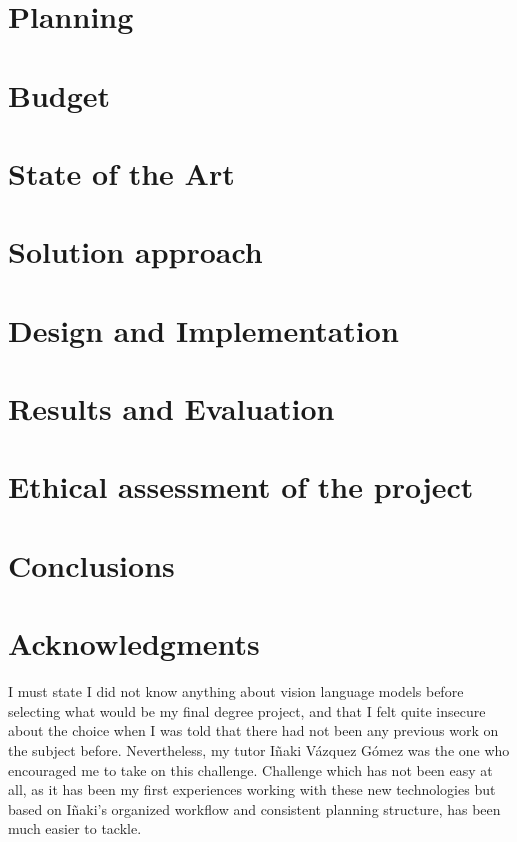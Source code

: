\documentclass{templateDeusto}
\begin{document}
	\chapter{Planning}
	
	
	\chapter{Budget}
	
	
	\chapter{State of the Art}
	
	
	\chapter{Solution approach}
		
	
	\chapter{Design and Implementation}
	\label{chapter:design_implementation}
	
	
	\chapter{Results and Evaluation}
	
	
	\chapter{Ethical assessment of the project}
	
	
	\chapter{Conclusions}
	
	
	
	\chapter*{Acknowledgments}
	I must state I did not know anything about vision language models before selecting what would be my final degree project, and that I felt quite insecure about the choice when I was told that there had not been any previous work on the subject before. Nevertheless, my tutor Iñaki Vázquez Gómez was the one who encouraged me to take on this challenge. Challenge which has not been easy at all, as it has been my first experiences working with these new technologies but based on Iñaki's organized workflow and consistent planning structure, has been much easier to tackle. 
	
\end{document}
